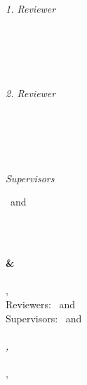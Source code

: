 \begin{titlepage}
	\vfill
	\begin{minipage}[t]{.27\textwidth}
		\raggedleft{}
		\textit{1. Reviewer}
	\end{minipage}
	\hspace*{15pt}
	\begin{minipage}[t]{.65\textwidth}
		{\Large \firstReviewer} \\
		{\small \firstReviewerTitle} \\[-1mm]
		{\small \firstReviewerCompany}
	\end{minipage} \\[5mm]
	\begin{minipage}[t]{.27\textwidth}
		\raggedleft{}
		\textit{2. Reviewer}
	\end{minipage}
	\hspace*{15pt}
	\begin{minipage}[t]{.65\textwidth}
		{\Large \secondReviewer} \\
		{\small \secondReviewerTitle} \\[-1mm]
		{\small \secondReviewerCompany}
	\end{minipage} \\[10mm]
	\begin{minipage}[t]{.27\textwidth}
		\raggedleft{}
		\textit{Supervisors}
	\end{minipage}
	\hspace*{15pt}
	\begin{minipage}[t]{.65\textwidth}
		\firstSupervisor\ and \secondSupervisor{}
	\end{minipage} \\[10mm]

	\reqDate\\

\end{titlepage}


\hfill
\vfill
{\small
	\textbf{\firstAuthorName{} \& \secondAuthorName}\\
	\textit{\specTitle}\\
	\reqSubject, \reqDate\\
	Reviewers: \firstReviewer\ and \secondReviewer\\
	Supervisors: \firstSupervisor\ and \secondSupervisor\\[1.5em]
	\textbf{\clientCompany} \\
	\textit{\clientCompanyGroup, \clientCompanyDepartment}\\
	\clientCompanyStreetAddress\\
	\clientCompanyCity, \clientCompanyState{} \clientCompanyPostalCode{}
}
